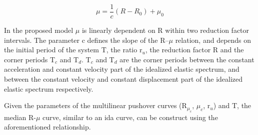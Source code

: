 \begin{equation}
\label{eq:mu_DF}
\mu = \frac{1}{c} (R-R_{0})+\mu_{0}
\end{equation}

In the proposed model $\mu$ is linearly dependent on R within two reduction factor intervals. The parameter c defines the slope of the R–$\mu$ relation, and depends on the initial period of the system T, the ratio r$_{u}$, the reduction factor R and the corner periods T$_{c}$ and T$_{d}$. T$_{c}$ and T$_{d}$ are the corner periods between the constant acceleration and constant velocity part of the idealized elastic spectrum, and between the constant velocity and constant displacement part of the idealized elastic spectrum respectively.

Given the parameters of the multilinear pushover curves (R$_{\mu_{c}}$, $\mu_{c}$, r$_{u}$) and T, the median R-$\mu$ curve, similar to an ida curve, can be construct using the aforementioned relationship.


